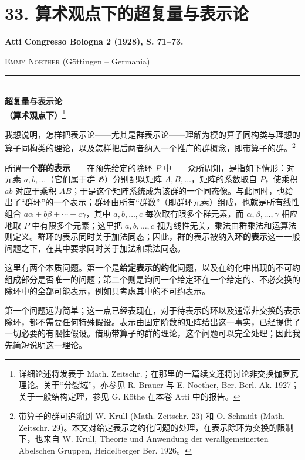 \documentclass[11pt]{article}
\newcommand{\srcemph}[1]{\textbf{#1}}
\newcommand{\srctextsc}[1]{\textbf{#1}}
\begin{document}
\setcounter{footnote}{0}
\section*{33. 算术观点下的超复量与表示论}
\srcemph{Atti Congresso Bologna 2 (1928), S. 71--73.}

\begingroup
\renewcommand{\thefootnote}{(\arabic{footnote})}

\begin{center}
\textsc{Emmy Noether} (Göttingen -- Germania)\\[-0.1em]
\rule{3em}{0.4pt}\\[0.8em]
\srctextsc{超复量与表示论}\\
\srctextsc{（算术观点下）}\footnote{详细论述将发表于 Math. Zeitschr.；在那里的一篇续文还将讨论非交换伽罗瓦理论。关于“分裂域”，亦参见 R. Brauer 与 E. Noether, Ber. Berl. Ak. 1927；关于一般结构定理，参见 G. Köthe 在本卷 Atti 中的报告。}
\end{center}

我想说明，怎样把表示论——尤其是群表示论——理解为模的算子同构类与理想的算子同构类的理论，以及怎样把后两者纳入一个推广的群概念，即带算子的群。\footnote{带算子的群可追溯到 W. Krull (Math. Zeitschr. 23) 和 O. Schmidt (Math. Zeitschr. 29)。本文对给定表示之约化问题的处理，在表示除环为交换的限制下，也来自 W. Krull, Theorie und Anwendung der verallgemeinerten Abelschen Gruppen, Heidelberger Ber. 1926。}

所谓\srcemph{一个群的表示}——在预先给定的除环 $P$ 中——众所周知，是指如下情形：对元素 $a,b,\ldots$（它们属于群 $\mathfrak{G}$）分别配以矩阵 $A,B,\ldots$，矩阵的系数取自 $P$，使乘积 $ab$ 对应于乘积 $AB$；于是这个矩阵系统成为该群的一个同态像。与此同时，也给出了“群环”的一个表示；群环由所有“群数”（即群环元素）组成，也就是所有线性组合 $a\alpha+b\beta+\cdots+c\gamma$，其中 $a,b,\ldots,c$ 每次取有限多个群元素，而 $\alpha,\beta,\ldots,\gamma$ 相应地取 $P$ 中有限多个元素；这里把 $a,b,\ldots,c$ 视为线性无关，乘法由群乘法和运算法则定义。群环的表示同时关于加法同态；因此，群的表示被纳入\srcemph{环的表示}这一一般问题之下，在其中要求同时关于加法和乘法同态。

这里有两个本质问题。第一个是\srcemph{给定表示的约化}问题，以及在约化中出现的不可约组成部分是否唯一的问题；第二个则是询问一个给定环在一个给定的、不必交换的除环中的全部可能表示，例如只考虑其中的不可约表示。

第一个问题远为简单；这一点已经表现在，对于待表示的环以及通常非交换的表示除环，都不需要任何特殊假设。表示由固定阶数的矩阵给出这一事实，已经提供了一切必要的有限性假设。借助带算子的群的理论，这个问题可以完全处理；因此我先简短说明这一理论。
\end{document}
